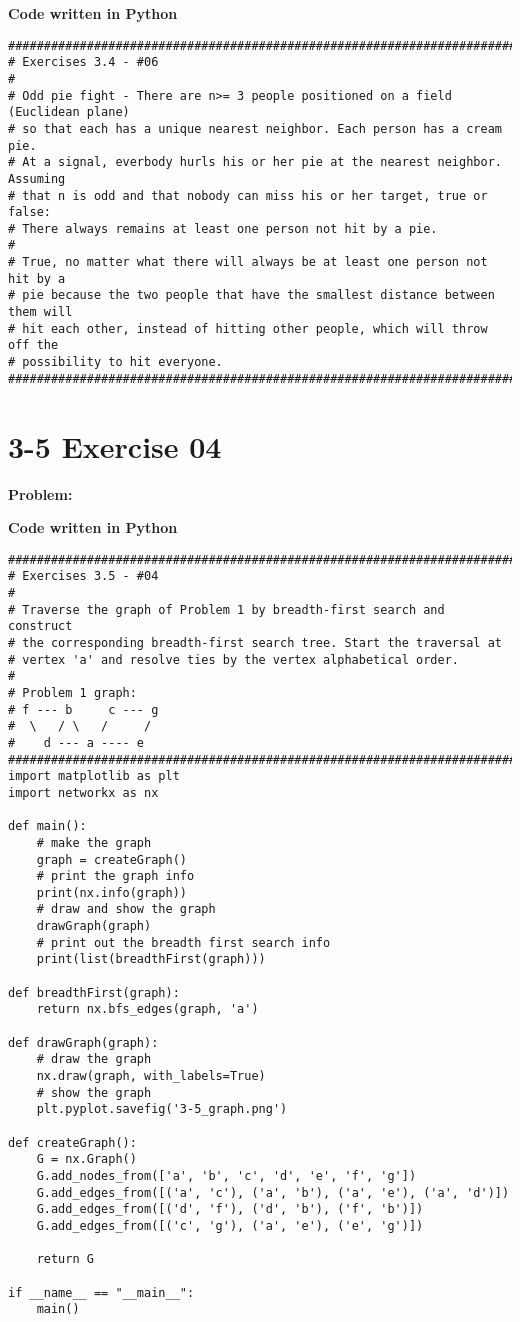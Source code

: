 \documentclass[paper=a4, fontsize=11pt]{scrartcl} %
\numberwithin{equation}{section}
\numberwithin{figure}{section}
\numberwithin{table}{section}
\begin{document}
\bigskip
\textbf{Code written in Python}
\begin{lstlisting}
############################################################################
# Exercises 3.4 - #06
# 
# Odd pie fight - There are n>= 3 people positioned on a field (Euclidean plane)
# so that each has a unique nearest neighbor. Each person has a cream pie.
# At a signal, everbody hurls his or her pie at the nearest neighbor. Assuming
# that n is odd and that nobody can miss his or her target, true or false:
# There always remains at least one person not hit by a pie.
#
# True, no matter what there will always be at least one person not hit by a
# pie because the two people that have the smallest distance between them will
# hit each other, instead of hitting other people, which will throw off the
# possibility to hit everyone.
############################################################################

\end{lstlisting}

\pagebreak


\section{3-5 Exercise 04}

\textbf{Problem:} 

\bigskip
\textbf{Code written in Python}
\begin{lstlisting}
########################################################################
# Exercises 3.5 - #04
#
# Traverse the graph of Problem 1 by breadth-first search and construct
# the corresponding breadth-first search tree. Start the traversal at 
# vertex 'a' and resolve ties by the vertex alphabetical order.
#
# Problem 1 graph:
# f --- b     c --- g
#  \   / \   /     /
#    d --- a ---- e
########################################################################
import matplotlib as plt
import networkx as nx

def main():
    # make the graph
    graph = createGraph()
    # print the graph info
    print(nx.info(graph))
    # draw and show the graph
    drawGraph(graph)
    # print out the breadth first search info
    print(list(breadthFirst(graph)))

def breadthFirst(graph):
    return nx.bfs_edges(graph, 'a')

def drawGraph(graph):
    # draw the graph
    nx.draw(graph, with_labels=True)
    # show the graph
    plt.pyplot.savefig('3-5_graph.png')

def createGraph():
    G = nx.Graph()
    G.add_nodes_from(['a', 'b', 'c', 'd', 'e', 'f', 'g'])
    G.add_edges_from([('a', 'c'), ('a', 'b'), ('a', 'e'), ('a', 'd')])
    G.add_edges_from([('d', 'f'), ('d', 'b'), ('f', 'b')])
    G.add_edges_from([('c', 'g'), ('a', 'e'), ('e', 'g')])

    return G

if __name__ == "__main__":
    main()
\end{lstlisting}
\end{document}
